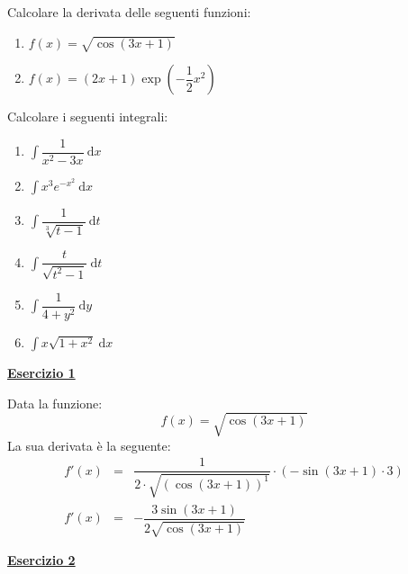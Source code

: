 \documentclass[a4paper]{article}
\newcommand{\example}[1]{\textcolor{Green4}{\textbf{#1}}}
\begin{document}
	Calcolare la derivata delle seguenti funzioni:
	\begin{enumerate}
		\item $f\left(x\right) = \sqrt{\cos\left(3x+1\right)}$

		\item $f\left(x\right) = \left(2x+1\right) \exp\left(-\dfrac{1}{2}x^{2}\right)$
	\end{enumerate}
	Calcolare i seguenti integrali:
	\begin{enumerate}[resume]
		\item $\displaystyle \int\dfrac{1}{x^{2} - 3x} \: \mathrm{d}x$

		\item $\displaystyle \int x^{3} e^{-x^{2}} \: \mathrm{d}x$

		\item $\displaystyle \int\dfrac{1}{\sqrt[3]{t-1}} \: \mathrm{d}t$

		\item $\displaystyle \int\dfrac{t}{\sqrt{t^{2} - 1}} \: \mathrm{d}t$

		\item $\displaystyle \int\dfrac{1}{4 + y^{2}} \: \mathrm{d}y$

		\item $\displaystyle \int x \sqrt{1+x^{2}} \: \mathrm{d}x$
	\end{enumerate}

	\begin{flushleft}
		\example{\underline{Esercizio 1}}
	\end{flushleft}

	\noindent
	Data la funzione:
	\begin{equation*}
		f\left(x\right) = \sqrt{\cos\left(3x+1\right)}
	\end{equation*}
	La sua derivata è la seguente:
	\begin{equation*}
		\begin{array}{rcl}
			f'\left(x\right) &=& \dfrac{1}{2 \cdot \sqrt{\left(\cos\left(3x+1\right)\right)^{1}}} \cdot \left(-\sin\left(3x+1\right) \cdot 3\right) \\ [2em]
			f'\left(x\right) &=& - \dfrac{3 \sin\left(3x+1\right)}{2 \sqrt{\cos\left(3x+1\right)}}
		\end{array}
	\end{equation*}

	\begin{flushleft}
		\example{\underline{Esercizio 2}}
	\end{flushleft}
\end{document}
